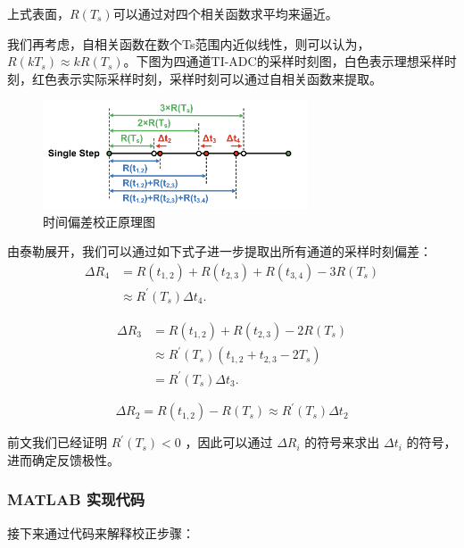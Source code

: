 \documentclass[cs4size,a4paper]{ctexart}
\numberwithin{equation}{section}
\numberwithin{table}{section}
\numberwithin{figure}{section}
\begin{document}
		上式表面，$R(T_s)$可以通过对四个相关函数求平均来逼近。
		
		我们再考虑，自相关函数在数个Ts范围内近似线性，则可以认为，$R(k T_s)≈kR(T_s)$。下图为四通道TI-ADC的采样时刻图，白色表示理想采样时刻，红色表示实际采样时刻，采样时刻可以通过自相关函数来提取。
		
		\begin{figure}[H]
			\centering
			\includegraphics[width=0.7\textwidth]{figure/cor1.png}
			\caption{时间偏差校正原理图} \label{fig:cor1}
		\end{figure}
		
		由泰勒展开，我们可以通过如下式子进一步提取出所有通道的采样时刻偏差：
		\begin{equation}
			\begin{aligned}
				\Delta R_4 & =R\left(t_{1,2}\right)+R\left(t_{2,3}\right)+R\left(t_{3,4}\right)-3 R\left(T_s\right) \\
				& \approx R^{\prime}\left(T_s\right) \Delta t_4 .
			\end{aligned}
		\end{equation}
		
		\begin{equation}
			\begin{aligned}
				\Delta R_3 & =R\left(t_{1,2}\right)+R\left(t_{2,3}\right)-2 R\left(T_s\right) \\
				& \approx R^{\prime}\left(T_s\right)\left(t_{1,2}+t_{2,3}-2 T_s\right) \\
				& =R^{\prime}\left(T_s\right) \Delta t_3 .
			\end{aligned}
		\end{equation}
		
		\begin{equation}
			\Delta R_2=R\left(t_{1,2}\right)-R\left(T_s\right) \approx R^{\prime}\left(T_s\right) \Delta t_2
		\end{equation}
		
		前文我们已经证明 $R^{\prime}(T_s)<0$ ，因此可以通过 $\Delta R_i$ 的符号来求出 $\Delta t_i$ 的符号，进而确定反馈极性。

			
		\subsubsection{MATLAB 实现代码}
		接下来通过代码来解释校正步骤：
		
\end{document}
